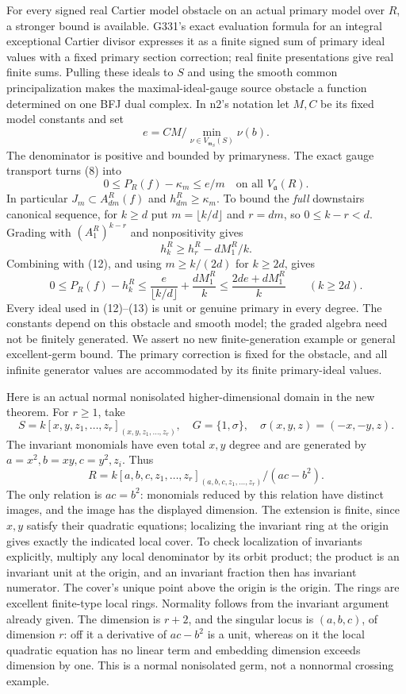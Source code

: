\documentclass[11pt]{article}
\begin{document}
For every signed real Cartier model obstacle on an actual primary model over $R$, a stronger bound is available. G331's exact evaluation formula for an integral exceptional Cartier divisor expresses it as a finite signed sum of primary ideal values with a fixed primary section correction; real finite presentations give real finite sums. Pulling these ideals to $S$ and using the smooth common principalization makes the maximal-ideal-gauge source obstacle a function determined on one BFJ dual complex. In n2's notation let $M,C$ be its fixed model constants and set
\[
 e=CM/\min_{\nu\in V_{\mathfrak m_S}(S)}\nu(b).
\]
The denominator is positive and bounded by primaryness. The exact gauge transport turns (8) into
\[
 0\le P_R(f)-\kappa_m\le e/m \quad\text{on all }V_{\mathfrak a}(R). \tag{12}
\]
In particular $J_m\subset A_{dm}^R(f)$ and $h_{dm}^R\ge\kappa_m$. To bound the \emph{full} downstairs canonical sequence, for $k\ge d$ put $m=\lfloor k/d\rfloor$ and $r=dm$, so $0\le k-r<d$. Grading with $(A_1^R)^{k-r}$ and nonpositivity gives
\[
 h_k^R\ge h_r^R-dM_1^R/k.
\]
Combining with (12), and using $m\ge k/(2d)$ for $k\ge2d$, gives
\[
 0\le P_R(f)-h_k^R
 \le \frac{e}{\lfloor k/d\rfloor}+\frac{dM_1^R}{k}
 \le\frac{2de+dM_1^R}{k}\qquad(k\ge2d). \tag{13}
\]
Every ideal used in (12)--(13) is unit or genuine primary in every degree. The constants depend on this obstacle and smooth model; the graded algebra need not be finitely generated. We assert no new finite-generation example or general excellent-germ bound. The primary correction is fixed for the obstacle, and all infinite generator values are accommodated by its finite primary-ideal values.

Here is an actual normal nonisolated higher-dimensional domain in the new theorem. For $r\ge1$, take
\[
 S=k[x,y,z_1,\ldots,z_r]_{(x,y,z_1,\ldots,z_r)},\quad
 G=\{1,\sigma\},\quad \sigma(x,y,z)=(-x,-y,z).
\]
The invariant monomials have even total $x,y$ degree and are generated by $a=x^2,b=xy,c=y^2,z_i$. Thus
\[
 R=k[a,b,c,z_1,\ldots,z_r]_{(a,b,c,z_1,\ldots,z_r)}/(ac-b^2).
\]
The only relation is $ac=b^2$: monomials reduced by this relation have distinct images, and the image has the displayed dimension. The extension is finite, since $x,y$ satisfy their quadratic equations; localizing the invariant ring at the origin gives exactly the indicated local cover. To check localization of invariants explicitly, multiply any local denominator by its orbit product; the product is an invariant unit at the origin, and an invariant fraction then has invariant numerator. The cover's unique point above the origin is the origin. The rings are excellent finite-type local rings. Normality follows from the invariant argument already given. The dimension is $r+2$, and the singular locus is $(a,b,c)$, of dimension $r$: off it a derivative of $ac-b^2$ is a unit, whereas on it the local quadratic equation has no linear term and embedding dimension exceeds dimension by one. This is a normal nonisolated germ, not a nonnormal crossing example.
\end{document}
